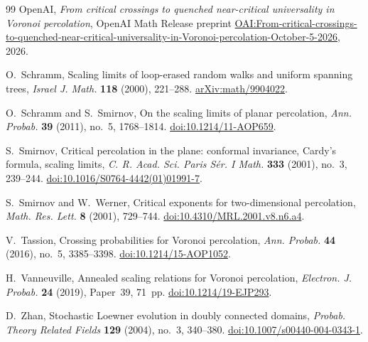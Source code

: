 \begin{thebibliography}{99}
OpenAI,
\emph{From critical crossings to quenched near-critical universality in Voronoi percolation},
OpenAI Math Release preprint
\href{https://github.com/openai/math/blob/main/preprints/From-critical-crossings-to-quenched-near-critical-universality-in-Voronoi-percolation-October-5-2026/critical-crossings-quenched-near-critical-universality-voronoi-percolation.pdf}{OAI:From-critical-crossings-to-quenched-near-critical-universality-in-Voronoi-percolation-October-5-2026},
2026.

O.~Schramm,
Scaling limits of loop-erased random walks and uniform spanning trees,
\emph{Israel J. Math.} \textbf{118} (2000), 221--288.
\href{https://arxiv.org/abs/math/9904022}{arXiv:math/9904022}.

O.~Schramm and S.~Smirnov,
On the scaling limits of planar percolation,
\emph{Ann. Probab.} \textbf{39} (2011), no.~5, 1768--1814.
\href{https://doi.org/10.1214/11-AOP659}{doi:10.1214/11-AOP659}.

S.~Smirnov,
Critical percolation in the plane: conformal invariance, Cardy's formula,
scaling limits,
\emph{C. R. Acad. Sci. Paris S\'er. I Math.} \textbf{333} (2001),
no.~3, 239--244.
\href{https://doi.org/10.1016/S0764-4442(01)01991-7}{doi:10.1016/S0764-4442(01)01991-7}.

S.~Smirnov and W.~Werner,
Critical exponents for two-dimensional percolation,
\emph{Math. Res. Lett.} \textbf{8} (2001), 729--744.
\href{https://doi.org/10.4310/MRL.2001.v8.n6.a4}{doi:10.4310/MRL.2001.v8.n6.a4}.

V.~Tassion,
Crossing probabilities for Voronoi percolation,
\emph{Ann. Probab.} \textbf{44} (2016), no.~5, 3385--3398.
\href{https://doi.org/10.1214/15-AOP1052}{doi:10.1214/15-AOP1052}.

H.~Vanneuville,
Annealed scaling relations for Voronoi percolation,
\emph{Electron. J. Probab.} \textbf{24} (2019), Paper~39, 71~pp.
\href{https://doi.org/10.1214/19-EJP293}{doi:10.1214/19-EJP293}.

D.~Zhan,
Stochastic Loewner evolution in doubly connected domains,
\emph{Probab. Theory Related Fields} \textbf{129} (2004), no.~3,
340--380.
\href{https://doi.org/10.1007/s00440-004-0343-1}{doi:10.1007/s00440-004-0343-1}.

\end{thebibliography}

